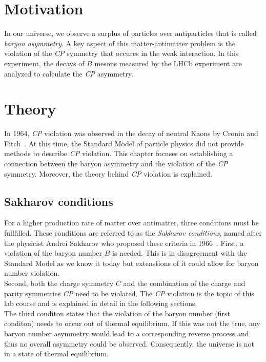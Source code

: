 \section{Motivation}
In our universe, we observe a surplus of particles over antiparticles that is called \textit{baryon asymmetry}. A key aspect of this matter-antimatter 
problem is the violation of the \textit{CP} symmetry that occures in the weak interaction. In this experiment, the decays of $B$ mesons measured by the LHCb experiment
are analyzed to calculate the \textit{CP} asymmetry.

\section{Theory}
\label{sec:Theory}
In 1964, \textit{CP} violation was observed in the decay of neutral Kaons by Cronin and Fitch~\cite{Cronin_Fitch_cpv}. At this time, the Standard Model of 
particle physics did not provide methods to describe \textit{CP} violation. This chapter focuses on establishing a connection between the baryon asymmetry
and the violation of the \textit{CP} symmetry. Moreover, the theory behind \textit{CP} violation is explained.

\subsection{Sakharov conditions}
\label{sec:sakharov_conditions}
For a higher production rate of matter over antimatter, three conditions must be fullfilled. These conditions are referred to as the \textit{Sakharov conditions},
named after the physicist Andrei Sakharov who proposed these criteria in 1966~\cite{Sakharov_conditions}.
First, a violation of the baryon number $B$ is needed. This is in disagreement with the Standard Model as we know it today but extenstions of it could
allow for baryon number violation. \\
Second, both the charge symmetry $C$ and the combination of the charge and parity symmetries \textit{CP} need to be violated. The \textit{CP} violation is the topic
of this lab course and is explained in detail in the following sections. \\
The third conditon states that the violation of the baryon number (first conditon) needs to occur out of thermal equilibrium. If this was not the true, any 
baryon number asymmetry would lead to a corresponding reverse process and thus no overall asymmetry could be observed. Consequently, the universe is not in
a state of thermal equilibrium.

